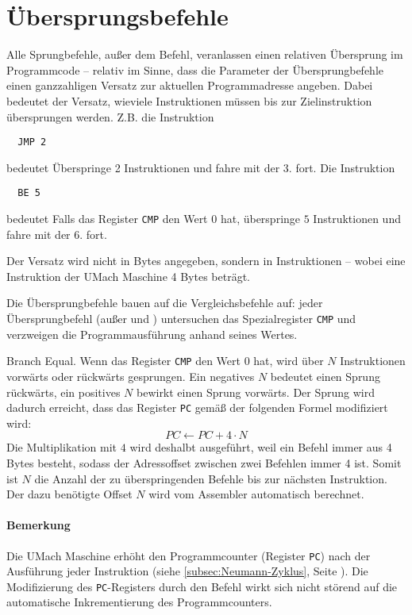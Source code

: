 \section{Übersprungsbefehle}
\label{sec:Sprungbefehle}

Alle Sprungbefehle, außer dem  Befehl, veranlassen einen relativen
Übersprung im Programmcode -- relativ im Sinne, dass die Parameter der
Übersprungbefehle einen ganzzahligen Versatz zur aktuellen Programmadresse
angeben. Dabei bedeutet der Versatz, wieviele Instruktionen
müssen bis zur Zielinstruktion übersprungen werden. Z.B. die Instruktion
\begin{lstlisting}
  JMP 2
\end{lstlisting}
bedeutet
\glqq Überspringe 2 Instruktionen und fahre mit der 3. fort\grqq.
Die Instruktion
\begin{lstlisting}
  BE 5
\end{lstlisting}
bedeutet
\glqq Falls das Register \texttt{CMP} den Wert $0$ hat, überspringe $5$
Instruktionen und fahre mit der 6. fort\grqq.

Der Versatz wird nicht in Bytes angegeben, sondern in
Instruktionen -- wobei eine Instruktion der UMach Maschine 4 Bytes beträgt.

Die Übersprungbefehle bauen auf die Vergleichsbefehle auf: jeder
Übersprungbefehl (außer  und ) untersuchen das
Spezialregister \texttt{CMP} und verzweigen die Programmausführung anhand seines
Wertes.


\glqq Branch Equal\grqq.
Wenn das Register \texttt{CMP} den Wert $0$ hat, wird über $N$ Instruktionen
vorwärts oder rückwärts gesprungen. Ein negatives $N$ bedeutet einen Sprung
rückwärts, ein positives $N$ bewirkt einen Sprung vorwärts. Der Sprung wird
dadurch erreicht, dass das Register \texttt{PC} gemäß der folgenden Formel
modifiziert wird:
\[
    PC \gets PC + 4 \cdot N
\]
Die Multiplikation mit $4$ wird deshalbt ausgeführt, weil ein Befehl immer aus 4
Bytes besteht, sodass der Adressoffset zwischen zwei Befehlen immer 4 ist. Somit
ist $N$ die Anzahl der zu überspringenden Befehle bis zur nächsten Instruktion.
Der dazu benötigte Offset $N$ wird vom Assembler automatisch berechnet. 

\paragraph{Bemerkung}
Die UMach Maschine erhöht den Programmcounter (Register \texttt{PC}) nach
der Ausführung jeder Instruktion
(siehe \ref{subsec:Neumann-Zyklus}, Seite
\pageref{subsec:Neumann-Zyklus}).
Die Modifizierung des \texttt{PC}-Registers durch den  Befehl wirkt
sich nicht störend auf die automatische Inkrementierung des Programmcounters.


